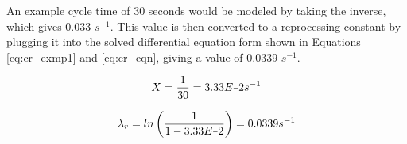 




An example cycle time of 30 seconds would be modeled by taking the inverse, which gives 0.033 $s^{-1}$. This value is then converted to a reprocessing constant by plugging it into the solved differential equation form shown in Equations \eqref{eq:cr_exmp1} and \eqref{eq:cr_eqn}, giving a value of 0.0339 $s^{-1}$.

\begin{equation} \hfill
X = \frac{1}{30} = 3.33E\minus2 s^{-1}
\hfill\label{eq:cr_exmp1} \end{equation}

\begin{equation} \hfill
\lambda_{r} = ln\left(\frac{1}{1 - 3.33E\minus2}\right) = 0.0339 s^{-1}
\hfill\label{eq:cr_eqn} \end{equation}



